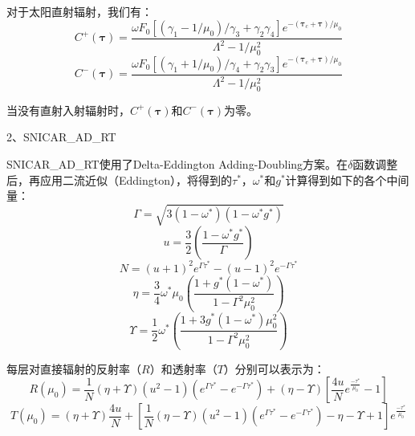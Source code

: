 对于太阳直射辐射，我们有：
\begin{equation}
C^{+}(\mathbf{\tau}) = \frac{\omega F_{0}\left\lbrack \left( \gamma_{1} - 1/\mu_{0} \right)/\gamma_{3} + \gamma_{2}\gamma_{4} \right\rbrack e^{- \left( \mathbf{\tau}_{c} + \mathbf{\tau} \right)/\mu_{0}}}{\Lambda^{2} - 1/\mu_{0}^{2}}
\end{equation}
\begin{equation}
C^{-}(\mathbf{\tau}) = \frac{\omega F_{0}\left\lbrack \left( \gamma_{1} + 1/\mu_{0} \right)/\gamma_{4} + \gamma_{2}\gamma_{3} \right\rbrack e^{- \left( \mathbf{\tau}_{c} + \mathbf{\tau} \right)/\mu_{0}}}{\Lambda^{2} - 1/\mu_{0}^{2}}
\end{equation}

当没有直射入射辐射时，\(C^{+}(\mathbf{\tau})\)和\(C^{-}(\mathbf{\tau})\)为零。

2、SNICAR\_AD\_RT

SNICAR\_AD\_RT使用了Delta-Eddington
Adding-Doubling方案。在$\delta$函数调整后，再应用二流近似（Eddington），将得到的$\tau^*$，$\omega^*$和$g^*$计算得到如下的各个中间量：
\begin{equation}
\Gamma = \sqrt{3(1 - \omega^{*})(1 - \omega^{*}g^{*})}
\end{equation}
\begin{equation}
u = \frac{3}{2}\left( \frac{1 - \omega^{*}g^{*}}{\Gamma} \right)
\end{equation}
\begin{equation}
N = {(u + 1)}^{2}e^{\Gamma\tau^{*}} - {(u - 1)}^{2}e^{- \Gamma\tau^{*}}
\end{equation}
\begin{equation}
\eta = \frac{3}{4}\omega^{*}\mu_{0}\left( \frac{1 + g^{*}(1 - \omega^{*})}{1 - \Gamma^{2}\mu_{0}^{2}} \right)
\end{equation}
\begin{equation}
\Upsilon = \frac{1}{2}\omega^{*}\left( \frac{1 + {3g}^{*}(1 - \omega^{*})\mu_{0}^{2}}{1 - \Gamma^{2}\mu_{0}^{2}} \right)
\end{equation}

每层对直接辐射的反射率（$R$）和透射率（$T$）分别可以表示为：
\begin{equation}
R\left( \mu_{0} \right) = \frac{1}{N}(\eta + \Upsilon)\left( u^{2} - 1 \right)\left( e^{\Gamma\tau^{*}} - e^{- \Gamma\tau^{*}} \right) + (\eta - \Upsilon)\left\lbrack \frac{4u}{N}e^{\frac{- \tau^{*}}{\mu_{0}}} - 1 \right\rbrack
\end{equation}
\begin{equation}
T\left( \mu_{0} \right) = (\eta + \Upsilon)\frac{4u}{N} + \left\lbrack \frac{1}{N}(\eta - \Upsilon)\left( u^{2} - 1 \right)\left( e^{\Gamma\tau^{*}} - e^{- \Gamma\tau^{*}} \right) - \eta - \Upsilon + 1 \right\rbrack e^{\frac{- \tau^{*}}{\mu_{0}}}
\end{equation}

